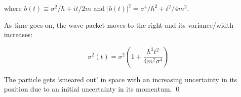 \documentclass[12pt]{article}
\begin{document}
where $b(t) \equiv \sigma^{2}/\hbar + it/2m$ and $\left\lvert b(t) \right\rvert^{2} = \sigma^{4}/\hbar^{2} + t^{2}/4m^{2}$.

As time goes on, the wave packet moves to the right and its variance/width increases:

\begin{equation}
    \sigma^{2}(t) = \sigma^{2} \left( 1 + \frac{\hbar^{2}t^{2}}{4m^{2}\sigma^{4}} \right)
\end{equation}

The particle gets `smeared out' in space with an increasing uncertainty in its position due to an initial uncertainty in its momentum.
\qed
\end{document}
